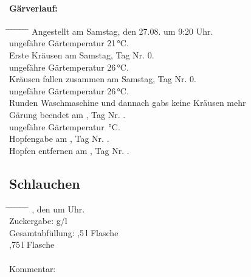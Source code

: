 \documentclass[12pt,oneside,a4paper]{scrartcl}
\begin{document}
{\paragraph{Gärverlauf:}
	\begin{tabbing}
		\hspace{1cm} \= \hspace{1cm} \= \hspace{1cm} \= \hspace{1cm} \= \hspace{1cm} \= \hspace{1cm} \= \hspace{1cm} \= \hspace{1cm} \= \kill
		\> Angestellt am Samstag, den 27.08. um 9:20 Uhr.\\
		\> \> ungefähre Gärtemperatur  21\,°C.\\
		\> Erste Kräusen am Samstag,  Tag Nr. 0.\\
		\> \> ungefähre Gärtemperatur 26\,°C.\\
		\> Kräusen fallen zusammen am Samstag, Tag Nr. 0.\\
		\> \> ungefähre Gärtemperatur 26\,°C.\\
		\>  Runden Waschmaschine und dannach gabs keine Kräusen mehr\\
		\> Gärung beendet am \vspace{2cm}, Tag Nr. \vspace{1cm}.\\
		\> \> ungefähre Gärtemperatur \vspace{1cm}\,°C.\\
		\> Hopfengabe am \vspace{2cm}, Tag Nr. \vspace{1cm}.\\
		\> Hopfen entfernen am \vspace{2cm}, Tag Nr. \vspace{1cm}.
	\end{tabbing}
%
\subsection*{Schlauchen}
	\begin{tabbing}
		\hspace{1cm} \= \hspace{1cm} \= \hspace{1cm} \= \hspace{1cm} \= \hspace{1cm} \= \hspace{1cm} \= \hspace{1cm} \= \hspace{1cm} \= \kill
		\> \vspace{2cm}, den  \vspace{2cm} um \vspace{1cm} Uhr.\\
		\> Zuckergabe:  \vspace{1cm}g/l\\
		\> Gesamtabfüllung: \> \> \> \>  ,5\,l Flasche\\
		\> \> \> \> \>  ,75\,l Flasche\\
		\\
		\> Kommentar: \>\>\>\\
	\end{tabbing}
%
}
\end{document}
